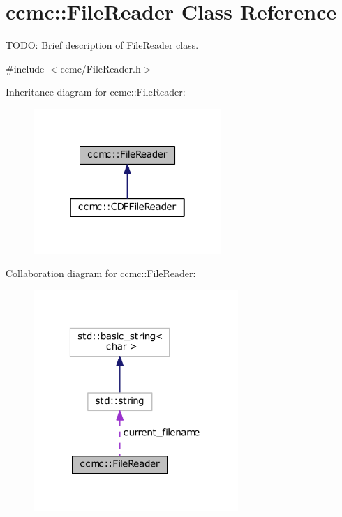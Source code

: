 \hypertarget{classccmc_1_1_file_reader}{\section{ccmc\-:\-:File\-Reader Class Reference}
\label{classccmc_1_1_file_reader}
}


T\-O\-D\-O\-: Brief description of \hyperlink{classccmc_1_1_file_reader}{File\-Reader} class.  




{\ttfamily \#include $<$ccmc/\-File\-Reader.\-h$>$}



Inheritance diagram for ccmc\-:\-:File\-Reader\-:
\nopagebreak
\begin{figure}[H]
\begin{center}
\leavevmode
\includegraphics[width=202pt]{classccmc_1_1_file_reader__inherit__graph}
\end{center}
\end{figure}


Collaboration diagram for ccmc\-:\-:File\-Reader\-:
\nopagebreak
\begin{figure}[H]
\begin{center}
\leavevmode
\includegraphics[width=220pt]{classccmc_1_1_file_reader__coll__graph}
\end{center}
\end{figure}
